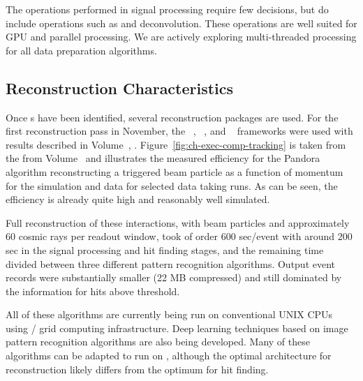 The operations performed in signal processing require few decisions, but do include operations such as  and deconvolution.  These operations are well suited for GPU and parallel processing. We are actively exploring multi-threaded processing for all data preparation algorithms. 


\subsection{Reconstruction Characteristics}



Once s have been identified, several \threed  reconstruction packages are used. For the first reconstruction pass in November, the  ~\cite{Acciarri:2017hat}, ~\cite{wirecell}, and ~\cite{ref:PMA}  frameworks were used with results described in Volume~\volnumberphysics{}, \voltitlephysics{}. 
Figure~\ref{fig:ch-exec-comp-tracking}  is taken from the from Volume~\volnumberphysics{} and illustrates the measured efficiency for the Pandora algorithm reconstructing a triggered beam particle as a function of momentum for the simulation and data for selected data taking runs. As can be seen, the efficiency is already quite high and reasonably well simulated.




Full reconstruction of these  interactions, with beam particles and approximately 60 cosmic rays per readout window, took of order 600 sec/event with around 200 sec in the signal processing and hit finding stages, and the remaining time divided between three different pattern recognition algorithms. Output event records were substantially smaller (22 MB compressed) and still dominated by the information for  hits above threshold. 

All of these algorithms are currently being run on conventional UNIX CPUs using / grid computing  infrastructure. Deep learning techniques based on image pattern recognition algorithms are also being developed. Many of these algorithms can be adapted to run on , although the optimal architecture for \threed reconstruction likely differs from the optimum for hit finding.



